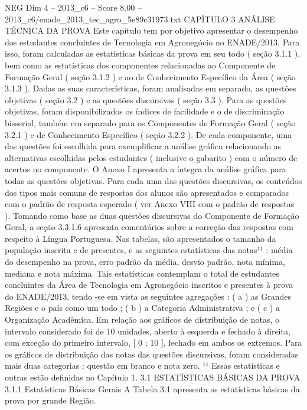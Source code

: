 \begin{textsample}{NEG Dim 4 – 2013\_c6 – Score 8.00 – 2013\_c6/enade\_2013\_tec\_agro\_5e89c31973.txt}  \label{ex:f4_neg_313}
CAPÍTULO 3 ANÁLISE TÉCNICA DA PROVA Este capítulo tem por objetivo apresentar o desempenho dos estudantes concluintes de Tecnologia em Agronegócio no ENADE/2013.
Para isso, foram calculadas as estatísticas básicas da prova em seu todo ( seção 3.1.1 ), bem como as estatísticas dos componentes relacionadas ao Componente de Formação Geral ( seção 3.1.2 ) e ao de Conhecimento Específico da Área ( seção 3.1.3 ).
Dadas as suas características, foram analisadas em separado, as questões objetivas ( seção 3.2 ) e as questões discursivas ( seção 3.3 ).
Para as questões objetivas, foram disponibilizados os índices de facilidade e o de discriminação bisserial, também em separado para os Componentes de Formação Geral ( seção 3.2.1 ) e de Conhecimento Específico ( seção 3.2.2 ).
De cada componente, uma das questões foi escolhida para exemplificar a análise gráfica relacionando as alternativas escolhidas pelos estudantes ( inclusive o gabarito ) com o número de acertos no componente.
O Anexo I apresenta a íntegra da análise gráfica para todas as questões objetivas.
Para cada uma das questões discursivas, os conteúdos dos tipos mais comuns de respostas dos alunos são apresentados e comparados com o padrão de resposta esperado ( ver Anexo VIII com o padrão de respostas ).
Tomando como base as duas questões discursivas do Componente de Formação Geral, a seção 3.3.1.6 apresenta comentários sobre a correção das respostas com respeito à Língua Portuguesa.
Nas tabelas, são apresentados o tamanho da população inscrita e de presentes, e as seguintes estatísticas das notas¹¹ : média do desempenho na prova, erro padrão da média, desvio padrão, nota mínima, mediana e nota máxima.
Tais estatísticas contemplam o total de estudantes concluintes da Área de Tecnologia em Agronegócio inscritos e presentes à prova do ENADE/2013, tendo -se em vista as seguintes agregações : ( a ) as Grandes Regiões e o país como um todo ; ( b ) a Categoria Administrativa ; e ( c ) a Organização Acadêmica.
Em relação aos gráficos de distribuição de notas, o intervalo considerado foi de 10 unidades, aberto à esquerda e fechado à direita, com exceção do primeiro intervalo, [ 0 ; 10 ], fechado em ambos os extremos.
Para os gráficos de distribuição das notas das questões discursivas, foram consideradas mais duas categorias : questão em branco e nota zero. ¹¹ Essas estatísticas e outras estão definidas no Capítulo 1. 3.1 ESTATÍSTICAS BÁSICAS DA PROVA 3.1.1 Estatísticas Básicas Gerais A Tabela 3.1 apresenta as estatísticas básicas da prova por grande Região.

\end{textsample}
